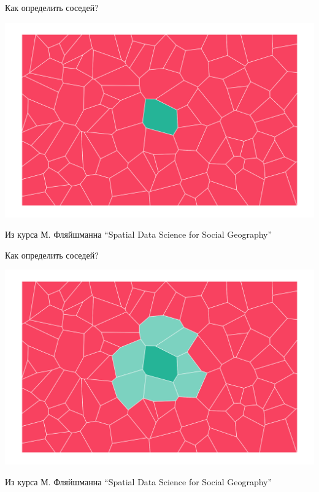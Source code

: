 \documentclass[
  ignorenonframetext,
  t]{beamer}
\begin{document}
\begin{frame}{Как определить соседей?}
\label{ux43aux430ux43a-ux43eux43fux440ux435ux434ux435ux43bux438ux442ux44c-ux441ux43eux441ux435ux434ux435ux439}
\begin{center}
\includegraphics[width=1\linewidth,height=\textheight,keepaspectratio]{images/04-neighbour.png}
\end{center}

Из курса М. Фляйшманна ``Spatial Data Science for Social Geography''
\end{frame}

\begin{frame}{Как определить соседей?}
\label{ux43aux430ux43a-ux43eux43fux440ux435ux434ux435ux43bux438ux442ux44c-ux441ux43eux441ux435ux434ux435ux439-1}
\begin{center}
\includegraphics[width=1\linewidth,height=\textheight,keepaspectratio]{images/05-neighbour.png}
\end{center}

Из курса М. Фляйшманна ``Spatial Data Science for Social Geography''
\end{frame}
\end{document}
